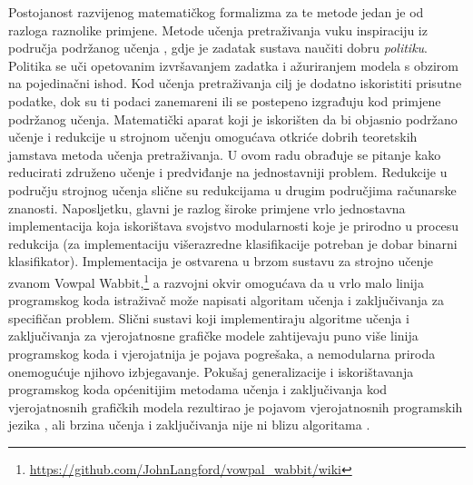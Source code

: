 Postojanost razvijenog matematičkog formalizma za te metode jedan je od razloga
raznolike primjene. Metode učenja pretraživanja vuku inspiraciju iz područja
podržanog učenja  \citep{sutton1998reinforcement},
gdje je zadatak sustava naučiti dobru \emph{politiku}. Politika se uči
opetovanim izvršavanjem zadatka i ažuriranjem modela s obzirom na pojedinačni
ishod. Kod učenja pretraživanja cilj je dodatno iskoristiti prisutne podatke,
dok su ti podaci zanemareni ili se postepeno izgrađuju kod primjene podržanog
učenja. Matematički aparat koji je iskorišten da bi objasnio podržano učenje i
redukcije u strojnom učenju  omogućava otkriće
dobrih teoretskih jamstava metoda učenja pretraživanja. U ovom radu obrađuje se
pitanje kako reducirati združeno učenje i predviđanje  na jednostavniji problem. Redukcije u području strojnog učenja
slične su redukcijama u drugim područjima računarske znanosti. Naposljetku,
glavni je razlog široke primjene vrlo jednostavna implementacija koja
iskorištava svojstvo modularnosti koje je prirodno u procesu redukcija (za
implementaciju višerazredne klasifikacije potreban je dobar binarni
klasifikator). Implementacija je ostvarena u brzom sustavu za strojno učenje
zvanom Vowpal
Wabbit,\footnote{\url{https://github.com/JohnLangford/vowpal_wabbit/wiki}} a
razvojni okvir \lts{} omogućava da u vrlo malo linija programskog koda
istraživač može napisati algoritam učenja i zaključivanja za specifičan problem.
Slični sustavi koji implementiraju algoritme učenja i zaključivanja za
vjerojatnosne grafičke modele zahtijevaju puno više linija programskog koda i
vjerojatnija je pojava pogrešaka, a nemodularna priroda onemogućuje njihovo
izbjegavanje. Pokušaj generalizacije i iskorištavanja programskog koda
općenitijim metodama učenja i zaključivanja kod vjerojatnosnih grafičkih modela
rezultirao je pojavom vjerojatnosnih programskih jezika , ali brzina učenja i zaključivanja nije ni blizu
algoritama \lts{}.

